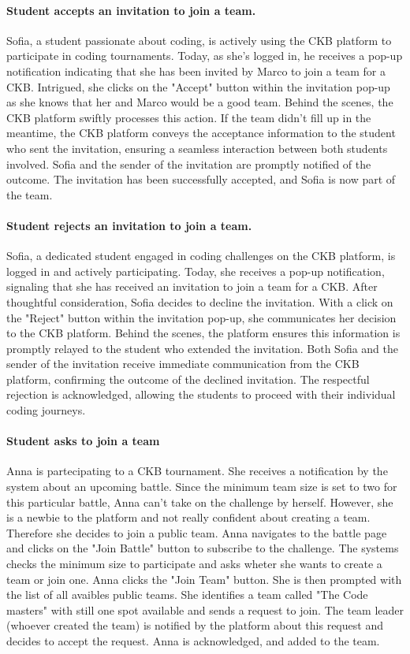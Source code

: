 \paragraph*{Student accepts an invitation to join a team.}
Sofia, a student passionate about coding, is actively using the CKB platform to participate in coding tournaments. 
Today, as she's logged in, he receives a pop-up notification indicating that she has been invited by Marco to join a team for a CKB.
Intrigued, she clicks on the "Accept" button within the invitation pop-up as she knows that her and Marco would be a good team. 
Behind the scenes, the CKB platform swiftly processes this action.
If the team didn't fill up in the meantime, the CKB platform conveys the acceptance information to the student who sent the invitation, ensuring a seamless interaction between both students involved.
Sofia and the sender of the invitation are promptly notified of the outcome. 
The invitation has been successfully accepted, and Sofia is now part of the team.



\paragraph*{Student rejects an invitation to join a team.}
Sofia, a dedicated student engaged in coding challenges on the CKB platform, is logged in and actively participating. 
Today, she receives a pop-up notification, signaling that she has received an invitation to join a team for a CKB.
After thoughtful consideration, Sofia decides to decline the invitation. 
With a click on the "Reject" button within the invitation pop-up, she communicates her decision to the CKB platform. 
Behind the scenes, the platform ensures this information is promptly relayed to the student who extended the invitation.
Both Sofia and the sender of the invitation receive immediate communication from the CKB platform, confirming the outcome of the declined invitation. 
The respectful rejection is acknowledged, allowing the students to proceed with their individual coding journeys.

\paragraph*{Student asks to join a team}
Anna is partecipating to a CKB tournament. She receives a notification by the system about an upcoming battle. 
Since the minimum team size is set to two for this particular battle, 
Anna can't take on the challenge by herself. 
However, she is a newbie to the platform and not really confident about creating a team. 
Therefore she decides to join a public team. Anna navigates 
to the battle page and clicks on the "Join Battle" button to subscribe to the challenge. The systems checks the minimum size to participate and asks wheter she wants to create a team or join one. 
Anna clicks the "Join Team" button. She is then prompted with the list of all avaibles public teams. 
She identifies a team called "The Code masters" with still one spot available 
and sends a request to join. The team leader (whoever created the team) is notified by the platform about this request and decides to accept the request. 
Anna is acknowledged, and added to the team.


